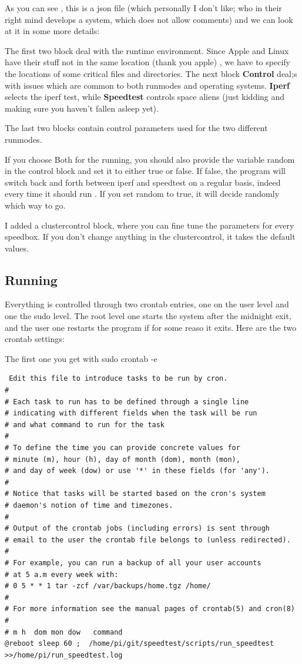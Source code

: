 \documentclass[11pt]{article}
\begin{document}
As you can see , this is a json file (which personally I don't like; who in their right mind develops a system, which does not allow comments) and we can look at it in some more details:

The first two block deal with the runtime environment. Since Apple and Linux have their stuff not in the same location (thank you apple) , we have to specify the locations of some critical files and directories. The next block \textbf{Control} deal;s with issues which are common to both runmodes and operating systems. \textbf{Iperf} selects the iperf test, while \textbf{Speedtest} controls space aliens (just kidding and making sure you haven't fallen asleep yet).

The last two blocks contain control parameters used for the two different runmodes.

If you choose Both for the running, you should also provide the variable random in the control block and set it to either true or false. If false, the program will switch back and forth between iperf and speedtest on a regular basis, indeed every time it should run . If you set random to true, it will decide randomly which way to go.

I added a clustercontrol block, where you can fine tune the parameters for every speedbox. If you don't change anything in the clustercontrol, it takes the default values.

\subsection{Running}

Everything is controlled through two crontab entries, one on the user level and one the sudo level.
The root level one starts the system after the midnight exit, and the user one restarts the program if for some reaso it exits. Here are the two crontab settings:

The first one you get with sudo crontab -e
\begin{verbatim}
 Edit this file to introduce tasks to be run by cron.
# 
# Each task to run has to be defined through a single line
# indicating with different fields when the task will be run
# and what command to run for the task
# 
# To define the time you can provide concrete values for
# minute (m), hour (h), day of month (dom), month (mon),
# and day of week (dow) or use '*' in these fields (for 'any').
# 
# Notice that tasks will be started based on the cron's system
# daemon's notion of time and timezones.
# 
# Output of the crontab jobs (including errors) is sent through
# email to the user the crontab file belongs to (unless redirected).
# 
# For example, you can run a backup of all your user accounts
# at 5 a.m every week with:
# 0 5 * * 1 tar -zcf /var/backups/home.tgz /home/
# 
# For more information see the manual pages of crontab(5) and cron(8)
# 
# m h  dom mon dow   command
@reboot sleep 60 ;  /home/pi/git/speedtest/scripts/run_speedtest >>/home/pi/run_speedtest.log
\end{verbatim}
\end{document}
